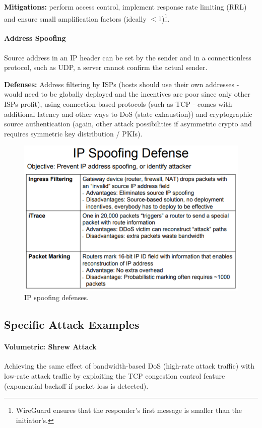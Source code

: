 \textbf{Mitigations:} perform access control, implement response rate limiting (RRL) and ensure small amplification factors (ideally $< 1$)\footnote{WireGuard ensures that the responder's first message is smaller than the initiator's.}.

\paragraph{Address Spoofing}
Source address in an IP header can be set by the sender and in a connectionless protocol, such as UDP, a server cannot confirm the actual sender.

\textbf{Defenses:} Address filtering by ISPs (hosts should use their own addresses - would need to be globally deployed and the incentives are poor since only other ISPs profit), using connection-based protocols (such as TCP - comes with additional latency and other ways to DoS (state exhaustion)) and cryptographic source authentication (again, other attack possibilities if asymmetric crypto and requires symmetric key distribution / PKIs).

\begin{figure}[h]
	\centering
	\includegraphics[scale=0.7]{images/910-ipspoof.PNG}
	\caption{IP spoofing defenses.}
	\label{fig:ipspoof}
\end{figure}

\subsection{Specific Attack Examples}

\paragraph{Volumetric: Shrew Attack}
Achieving the same effect of bandwidth-based DoS (high-rate attack traffic) with low-rate attack traffic by exploiting the TCP congestion control feature (exponential backoff if packet loss is detected).

